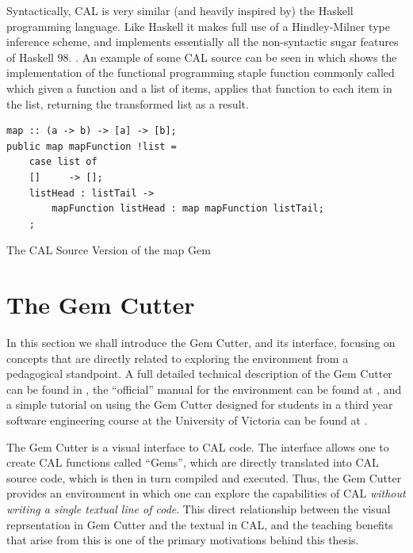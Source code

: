 Syntactically, CAL is very similar (and heavily inspired by) the Haskell programming language.  Like Haskell it makes full use of a Hindley-Milner type inference scheme, and implements essentially all the non-syntactic sugar features of Haskell 98. \cite{evans07, Ilic07}.  An example of some CAL source can be seen in  which shows the implementation of the functional programming staple function commonly called  which given a function and a list of items, applies that function to each item in the list, returning the transformed list as a result.  


\begin{program}
\begin{verbatim}
map :: (a -> b) -> [a] -> [b]; 
public map mapFunction !list = 
    case list of 
    []     -> []; 
    listHead : listTail ->  
        mapFunction listHead : map mapFunction listTail; 
    ; 
\end{verbatim}
\caption{The CAL Source Version of the map Gem}
\label{prog:calmap}
\end{program}

\section{The Gem Cutter}

In this section we shall introduce the Gem Cutter, and its interface, focusing on concepts that are directly related to exploring the environment from a pedagogical standpoint.  A full detailed technical description of the Gem Cutter can be found in \cite{evans07}, the ``official'' manual for the environment can be found at \cite{evans06}, and a simple tutorial on using the Gem Cutter designed for students in a third year software engineering course at the University of Victoria can be found at \cite{parkin08}.

The Gem Cutter is a visual interface to CAL code.  The interface allows one to create CAL functions called ``Gems'', which are directly translated into CAL source code, which is then in turn compiled and executed.  Thus, the Gem Cutter provides an environment in which one can explore the capabilities of CAL \emph{without writing a single textual line of code}.  This direct relationship between the visual reprsentation in Gem Cutter and the textual in CAL, and the teaching benefits that arise from this is one of the primary motivations behind this thesis.

